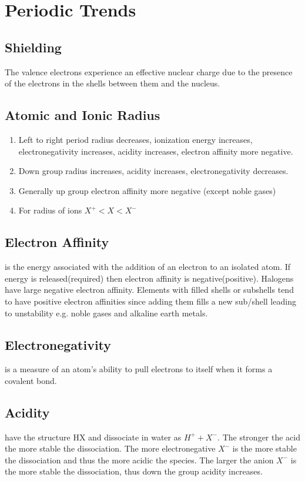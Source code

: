 \documentclass[../GChemReview.tex]{subfiles}
\begin{document}
  \section{Periodic Trends}

  \subsection{Shielding}

  The valence electrons experience an effective nuclear charge due to the
  presence of the electrons in the shells between them and the nucleus.

  \subsection{Atomic and Ionic Radius}

  \begin{enumerate}
    \item Left to right period radius decreases, ionization energy increases,
      electronegativity increases, acidity increases, electron affinity more
      negative.  
    \item Down group radius increases, acidity increases,
      electronegativity decreases.
    \item Generally up group electron affinity more negative (except noble gases)
    \item For radius of ions $ X^{+} < X < X^{-} $
  \end{enumerate}

  \subsection{Electron Affinity}

   is the energy associated with the addition of an
  electron to an isolated atom. If energy is released(required) then electron
  affinity is negative(positive). Halogens have large negative electron
  affinity. Elements with filled shells or subshells tend to have positive
  electron affinities since adding them fills a new sub/shell leading to
  unstability e.g. noble gases and alkaline earth metals. 

  \subsection{Electronegativity}

   is a measure of an atom's ability to pull electrons
  to itself when it forms a covalent bond.

  \subsection{Acidity}

   have the structure HX and dissociate in water as $ H^{+}
  + X^{-} $. The stronger the acid the more stable the dissociation. The more
  electronegative $ X^{-} $ is the more stable the dissociation and thus the
  more acidic the species. The larger the anion $ X^{-} $ is the more stable the
  dissociation, thus down the group acidity increases.
\end{document}
